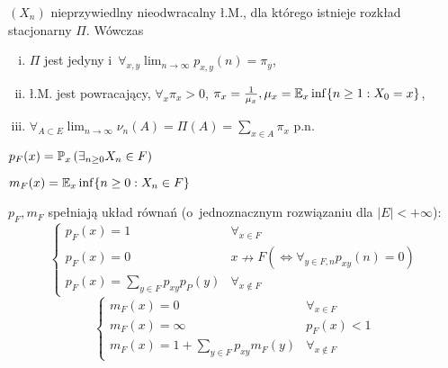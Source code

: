 	\begin{theorem}
		$(X_n)$ nieprzywiedlny nieodwracalny ł.M., dla którego istnieje
		rozkład stacjonarny $\Pi$. Wówczas
		\begin{enumerate}[(i)]
			\item $\Pi$ jest jedyny i~$\forall_{x, y} 
				\lim_{n \to \infty} p_{x,y}(n) = \pi_y$,
			\item ł.M. jest powracający, $\forall_x \pi_x >0$,
			$\pi_x = \frac1{\mu_x}, 
			\mu_x = \E_x \inf \{ n \geq 1: X_0 = x \}$,
			\item $\forall_{A \subset E} \lim_{n \to \infty}
				\nu_n(A) = \Pi(A) = \sum_{x \in A} \pi_x$ p.n.
		\end{enumerate}

	\end{theorem}
	
	\begin{definition}
		$\displaystyle p_F(x) = 
			\P_x \left(\exists_{n \geq 0} X_n \in F\right)$
	\end{definition}
	
	\begin{definition}
		$m_F(x) = \E_x \inf \{ n \geq 0: X_n \in F \}$
	\end{definition}
	
	\begin{fact}
		$p_F, m_F$ spełniają układ równań (o~jednoznacznym 
		rozwiązaniu dla $|E| < + \infty$):
		$$
		\begin{cases}
			p_F (x) = 1 & \forall_{x \in F}\\
			p_F(x) = 0 & x \nrightarrow F 
			(\iff \forall_{y\in F,n} p_{xy}(n) = 0) \\
			p_F(x) = \sum_{y \in F} p_{xy} p_P(y)
				& \forall_{x \notin F}
		\end{cases}
		$$
		$$
		\begin{cases}
			m_F (x) = 0 & \forall_{x \in F}\\
			m_F(x) = \infty & p_F(x) < 1 \\
			m_F(x) = 1 + \sum_{y \in F} p_{xy} m_F(y) 
			& \forall_{x \notin F}
		\end{cases}
		$$
	\end{fact}














 
 
